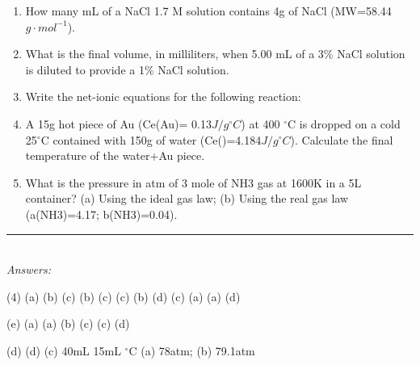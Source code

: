 \documentclass[main.tex]{subfiles}
\begin{document}
\begin{fullwidth}
\begin{multicols}{2}
\begin{enumerate}[resume]
\item  How many mL of a NaCl 1.7 M solution contains 4g of NaCl (MW=58.44 $g\cdot mol^{-1}$).
\vspace{2cm}


\item What is the final volume, in milliliters, when 5.00 mL of a 3\% NaCl solution is diluted to provide a 1\%  NaCl solution.
\vspace{2cm}

\item Write the net-ionic equations for the following reaction:
\begin{center}\end{center}
\vspace{2cm}

\item A 15g hot piece of Au (Ce(Au)= 0.13$J/g ^{\circ}C$) at 400 $^{\circ}$C  is dropped on a cold 25$^{\circ}$C contained with 150g of water (Ce()=4.184$J/g ^{\circ}C$). Calculate the final temperature of the water+Au piece.
\vspace{2cm}


\item What is the pressure in atm of 3 mole of NH3 gas at 1600K in a 5L container?
(a) Using the ideal gas law; (b) Using the real gas law (a(NH3)=4.17; b(NH3)=0.04).

\vspace{2cm}


 \end{enumerate}
\end{multicols}
\end{fullwidth}
\begin{fullwidth}
\par\noindent\rule{0.5\textwidth}{0.4pt}\\
\emph{Answers:}\\
\vspace{-0.5cm}
\begin{tasks}[counter-format={tsk[1].}, label-align=left, label-offset={0mm}, label-width={5mm}, item-indent={1mm}, label-format={\bfseries}](4)
\task (a) 
\task (b) 
\task (c) 
\task (b)
\task (c)
\task (c)
\task (b) 
\task (d) 
\task (c) 
\task (a) 
\task (a) 
\task (d) 

\task (e) 
\task (a) 
\task (a) 
\task (b) 
\task (c) 
\task (c) 
\task (d) 

\task (d) 
\task (d) 
\task (c)
\task 40mL
\task 15mL
 \task \small {}
$^{\circ}$C
\task (a) 78atm; (b) 79.1atm

\end{tasks}






\end{fullwidth}
\restoregeometry
\end{document}
